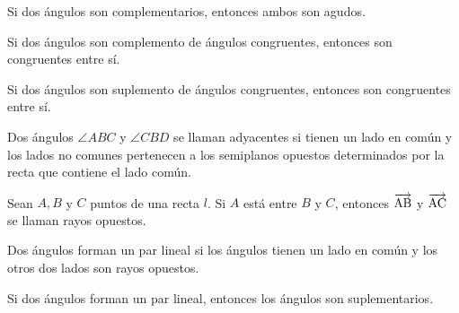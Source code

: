 \begin{theorem}
    Si dos ángulos son complementarios, entonces ambos son agudos.
\end{theorem}

\begin{theorem}
    Si dos ángulos son complemento de ángulos congruentes, entonces son congruentes entre sí.
\end{theorem}

\begin{theorem}
    Si dos ángulos son suplemento de ángulos congruentes, entonces son congruentes entre sí.
\end{theorem}

\begin{definition}
    Dos ángulos $\angle{ABC}$ y $\angle{CBD}$ se llaman adyacentes si tienen un lado en común y los lados no comunes pertenecen a los semiplanos opuestos determinados por la recta que contiene el lado común.
\end{definition}

\begin{definition}
    Sean $A,B$ y $C$ puntos de una recta $l$. Si $A$ está entre $B$ y $C$, entonces $\overrightarrow{\rm AB}$ y $\overrightarrow{\rm AC}$ se llaman rayos opuestos.

    \begin{figure}[!h]
        \centering
        
        \label{fig:oposing-rays}
    \end{figure}
    
\end{definition}

\begin{definition}
    Dos ángulos forman un par lineal si los ángulos tienen un lado en común y los otros dos lados son rayos opuestos.

    \begin{figure}[!h]
        \centering
        
        \label{fig:linear-pair}
    \end{figure}    
    
\end{definition}

\begin{postulate}
    Si dos ángulos forman un par lineal, entonces los ángulos son suplementarios.
\end{postulate}

